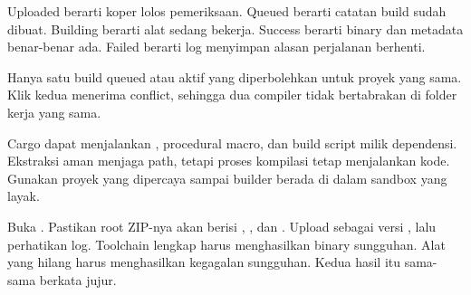 Uploaded berarti koper lolos pemeriksaan. Queued berarti catatan build sudah dibuat. Building berarti alat sedang bekerja. Success berarti binary dan metadata benar-benar ada. Failed berarti log menyimpan alasan perjalanan berhenti.

Hanya satu build queued atau aktif yang diperbolehkan untuk proyek yang sama. Klik kedua menerima conflict, sehingga dua compiler tidak bertabrakan di folder kerja yang sama.

\begin{warningbox}
Cargo dapat menjalankan , procedural macro, dan build script milik dependensi. Ekstraksi aman menjaga path, tetapi proses kompilasi tetap menjalankan kode. Gunakan proyek yang dipercaya sampai builder berada di dalam sandbox yang layak.
\end{warningbox}

\begin{checkpoint}
Buka . Pastikan root ZIP-nya akan berisi , , dan . Upload sebagai versi , lalu perhatikan log. Toolchain lengkap harus menghasilkan binary sungguhan. Alat yang hilang harus menghasilkan kegagalan sungguhan. Kedua hasil itu sama-sama berkata jujur.
\end{checkpoint}
